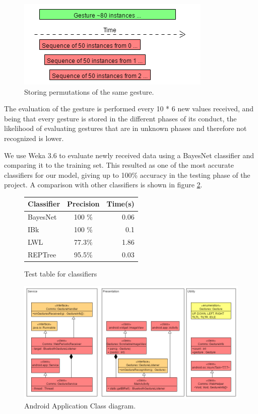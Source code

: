 \begin{figure}[!h]
\centering
\includegraphics[width=1\columnwidth]{img/gesture_window_example}
\caption{Storing permutations of the same gesture.}
\label{fig:training}
\end{figure}

The evaluation of the gesture is performed every 10 * 6 new values received,
 and being that every gesture is stored in the different phases of its conduct,
  the likelihood of evaluating gestures that are in unknown phases and therefore not recognized is lower.

We use Weka 3.6 \cite{weka} to evaluate newly received data using a BayesNet classifier and comparing it to the training set. 
This resulted as one of the most accurate classifiers for our model, giving up to 100\% accuracy in the testing phase of the project. A comparison with other classifiers is shown in figure \ref{fig:wekaclass}.

\begin{figure}[h]
\begin{center}
\begin{tabular}{ l  c r }
Classifier & Precision & Time(s)\\ [0.5ex]
\hline \hline
BayesNet & 100 \%  & 0.06\\ 
IBk & 100 \% & 0.1 \\
LWL & 77.3\%  & 1.86\\
REPTree & 95.5\%  & 0.03 \\ [1ex]
\end{tabular}
\end{center}
\caption{Test table for classifiers}
\label{fig:wekaclass}
\end{figure}

\begin{figure}[!h]
\centering
\includegraphics[width=1\columnwidth]{img/android_class_diagram}
\caption{Android Application Class diagram.}
\label{fig:and_class}
\end{figure}

